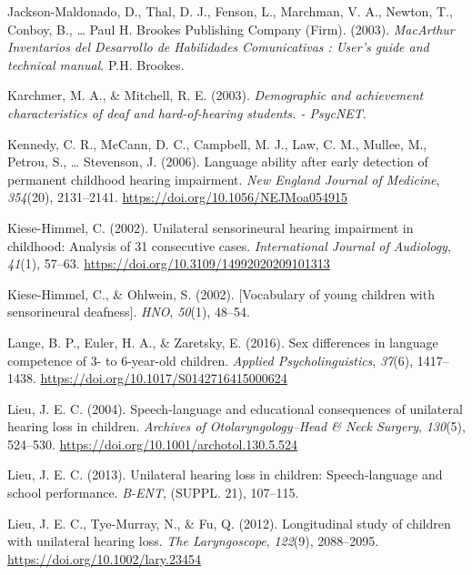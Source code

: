 \documentclass[english,man,floatsintext]{apa6}
\begin{document}
\leavevmode\hypertarget{ref-jackson-maldonado2003}{}%
Jackson-Maldonado, D., Thal, D. J., Fenson, L., Marchman, V. A., Newton, T., Conboy, B., \ldots{} Paul H. Brookes Publishing Company (Firm). (2003). \emph{MacArthur Inventarios del Desarrollo de Habilidades Comunicativas : User's guide and technical manual}. P.H. Brookes.

\leavevmode\hypertarget{ref-karchmer2003}{}%
Karchmer, M. A., \& Mitchell, R. E. (2003). \emph{Demographic and achievement characteristics of deaf and hard-of-hearing students. - PsycNET}.

\leavevmode\hypertarget{ref-kennedy2006}{}%
Kennedy, C. R., McCann, D. C., Campbell, M. J., Law, C. M., Mullee, M., Petrou, S., \ldots{} Stevenson, J. (2006). Language ability after early detection of permanent childhood hearing impairment. \emph{New England Journal of Medicine}, \emph{354}(20), 2131--2141. \url{https://doi.org/10.1056/NEJMoa054915}

\leavevmode\hypertarget{ref-kiese-himmel2002}{}%
Kiese-Himmel, C. (2002). Unilateral sensorineural hearing impairment in childhood: Analysis of 31 consecutive cases. \emph{International Journal of Audiology}, \emph{41}(1), 57--63. \url{https://doi.org/10.3109/14992020209101313}

\leavevmode\hypertarget{ref-kiese-himmel2002a}{}%
Kiese-Himmel, C., \& Ohlwein, S. (2002). {[}Vocabulary of young children with sensorineural deafness{]}. \emph{HNO}, \emph{50}(1), 48--54.

\leavevmode\hypertarget{ref-lange2016}{}%
Lange, B. P., Euler, H. A., \& Zaretsky, E. (2016). Sex differences in language competence of 3- to 6-year-old children. \emph{Applied Psycholinguistics}, \emph{37}(6), 1417--1438. \url{https://doi.org/10.1017/S0142716415000624}

\leavevmode\hypertarget{ref-lieu2004}{}%
Lieu, J. E. C. (2004). Speech-language and educational consequences of unilateral hearing loss in children. \emph{Archives of Otolaryngology--Head \& Neck Surgery}, \emph{130}(5), 524--530. \url{https://doi.org/10.1001/archotol.130.5.524}

\leavevmode\hypertarget{ref-lieu2013}{}%
Lieu, J. E. C. (2013). Unilateral hearing loss in children: Speech-language and school performance. \emph{B-ENT}, (SUPPL. 21), 107--115.

\leavevmode\hypertarget{ref-lieu2012}{}%
Lieu, J. E. C., Tye-Murray, N., \& Fu, Q. (2012). Longitudinal study of children with unilateral hearing loss. \emph{The Laryngoscope}, \emph{122}(9), 2088--2095. \url{https://doi.org/10.1002/lary.23454}
\end{document}
